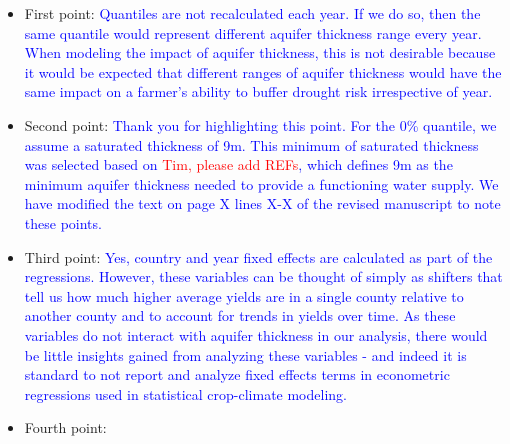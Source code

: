 \documentclass[
]{article}
\begin{document}
\begin{itemize}
\item
  First point:
  \textcolor{blue}{Quantiles are not recalculated each year. If we do so, then the same quantile would represent different aquifer thickness range every year. When modeling the impact of aquifer thickness, this is not desirable because it would be expected that different ranges of aquifer thickness would have the same impact on a farmer's ability to buffer drought risk irrespective of year.}
\item
  Second point:
  \textcolor{blue}{Thank you for highlighting this point. For the 0\% quantile, we assume a saturated thickness of 9m. This minimum of saturated thickness was selected based on \textcolor{red}{Tim, please add REFs}, which defines 9m as the minimum aquifer thickness needed to provide a functioning water supply. We have modified the text on page X lines X-X of the revised manuscript to note these points.}
\item
  Third point:
  \textcolor{blue}{Yes, country and year fixed effects are calculated as part of the regressions. However, these variables can be thought of simply as shifters that tell us how much higher average yields are in a single county relative to another county and to account for trends in yields over time. As these variables do not interact with aquifer thickness in our analysis, there would be little insights gained from analyzing these variables - and indeed it is standard to not report and analyze fixed effects terms in econometric regressions used in statistical crop-climate modeling.}
\item
  Fourth point:

\end{itemize}
\end{document}
